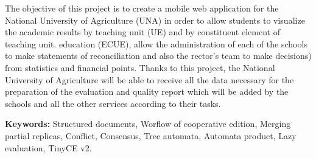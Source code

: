 \let\oldprintchaptertitle=\printchaptertitle
\renewcommand{\printchaptertitle}[1]{%
	\vspace*{-75pt}
	\oldprintchaptertitle{#1}
}%
\let\printchaptertitle=\oldprintchaptertitle
The objective of this project is to create a mobile web application for the National University of Agriculture (UNA) in order to allow students to visualize the academic results by teaching unit (UE) and by constituent element of teaching unit. education (ECUE), allow the administration of each of the schools to make statements of reconciliation and also the rector's team to make decisions) from statistics and financial points. 
Thanks to this project, the National University of Agriculture will be able to receive all the data necessary for the preparation of the evaluation and quality report which will be added by the schools and all the other services according to their tasks.
	
\vspace{1cm}
\noindent\textbf{Keywords:} Structured documents, Worflow of cooperative edition, Merging partial replicas, Conflict, Consensus, Tree automata, Automata product, Lazy evaluation, TinyCE v2.

\myCleanStarChapterEnd
